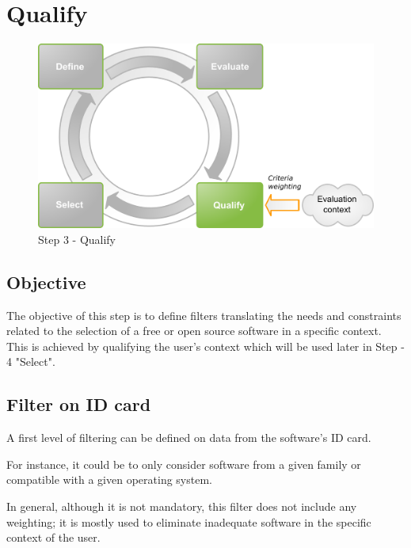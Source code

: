 %
\section{Qualify}
\begin{figure}[h]
\includegraphics[width=13cm]{images/qualifier}
\caption{Step 3 - Qualify}
\end{figure}

\subsection{Objective}
The objective of this step is to define filters translating the needs and constraints 
related to the selection of a free or open source software in a specific context. 
This is achieved by qualifying the user's context which will be used later in Step - 4 "Select".


\subsection{Filter on ID card}
A first level of filtering can be defined on data from the software's ID card.


For instance, it could be to only consider software from a given family or 
compatible with a given operating system.


In general, although it is not mandatory, this filter does not include 
any weighting; it is mostly used to eliminate inadequate software 
in the specific context of the user.

